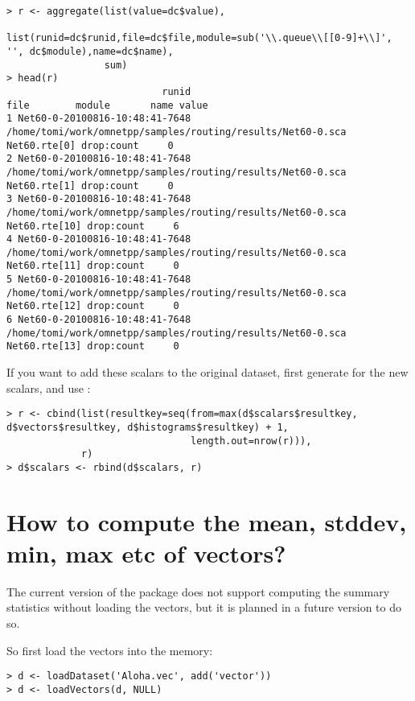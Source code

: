 \begin{verbatim}
> r <- aggregate(list(value=dc$value),
                 list(runid=dc$runid,file=dc$file,module=sub('\\.queue\\[[0-9]+\\]', '', dc$module),name=dc$name),
                 sum)
> head(r)
                           runid                                                        file        module       name value
1 Net60-0-20100816-10:48:41-7648 /home/tomi/work/omnetpp/samples/routing/results/Net60-0.sca  Net60.rte[0] drop:count     0
2 Net60-0-20100816-10:48:41-7648 /home/tomi/work/omnetpp/samples/routing/results/Net60-0.sca  Net60.rte[1] drop:count     0
3 Net60-0-20100816-10:48:41-7648 /home/tomi/work/omnetpp/samples/routing/results/Net60-0.sca Net60.rte[10] drop:count     6
4 Net60-0-20100816-10:48:41-7648 /home/tomi/work/omnetpp/samples/routing/results/Net60-0.sca Net60.rte[11] drop:count     0
5 Net60-0-20100816-10:48:41-7648 /home/tomi/work/omnetpp/samples/routing/results/Net60-0.sca Net60.rte[12] drop:count     0
6 Net60-0-20100816-10:48:41-7648 /home/tomi/work/omnetpp/samples/routing/results/Net60-0.sca Net60.rte[13] drop:count     0

\end{verbatim}

If you want to add these scalars to the original dataset, first generate  for the new scalars,
and use :

\begin{verbatim}
> r <- cbind(list(resultkey=seq(from=max(d$scalars$resultkey, d$vectors$resultkey, d$histograms$resultkey) + 1,
                                length.out=nrow(r))),
             r)
> d$scalars <- rbind(d$scalars, r)
\end{verbatim}

\section{How to compute the mean, stddev, min, max etc of vectors?}

The current version of the  package does not support computing
the summary statistics without loading the vectors, but it is planned in a future
version to do so.

So first load the vectors into the memory:

\begin{verbatim}
> d <- loadDataset('Aloha.vec', add('vector'))
> d <- loadVectors(d, NULL)
\end{verbatim}

